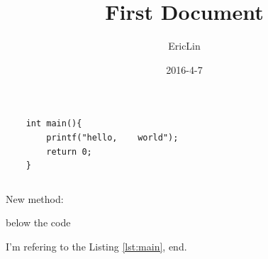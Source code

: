 \documentclass{article}
\title{First Document}
\date{2016-4-7}
\author{EricLin}
\begin{document}
\maketitle

\begin{verbatim}
	int main(){
		printf("hello,    world");
		return 0;
	}
\end{verbatim}


\inputminted{cpp}{main.cpp}


New method:
\begin{listing}[H]
	\caption{below the code}
	\label{lst:previous-main}
\end{listing}

I'm refering to the Listing \ref{lst:main}, end.
\end{document}
